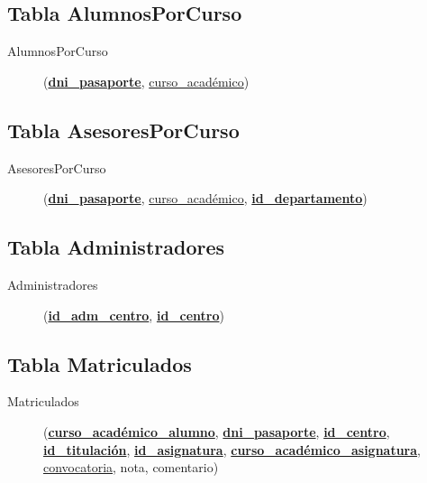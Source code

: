    \subsection{Tabla AlumnosPorCurso}

      \begin{description}
         \item[AlumnosPorCurso] \begin{flushleft}(\underline{\textbf{dni\_pasaporte}},
         \underline{curso\_académico})\end{flushleft}
      \end{description}


   \subsection{Tabla AsesoresPorCurso}

      \begin{description}
         \item[AsesoresPorCurso] \begin{flushleft}(\underline{\textbf{dni\_pasaporte}},
         \underline{curso\_académico}, \underline{\textbf{id\_departamento}})
         \end{flushleft}
      \end{description}

   \subsection{Tabla Administradores}

      \begin{description}
         \item[Administradores] \begin{flushleft}(\underline{\textbf{id\_adm\_centro}},
         \underline{\textbf{id\_centro}})\end{flushleft}
      \end{description}

   \subsection{Tabla Matriculados}

      \begin{description}
         \item[Matriculados] \begin{flushleft}(\underline{\textbf{curso\_académico\_alumno}},
         \underline{\textbf{dni\_pasaporte}}, \underline{\textbf{id\_centro}},
         \underline{\textbf{id\_titulación}}, \underline{\textbf{id\_asignatura}},
         \underline{\textbf{curso\_académico\_asignatura}}, \underline{convocatoria}, nota,
         comentario)\end{flushleft}
      \end{description}